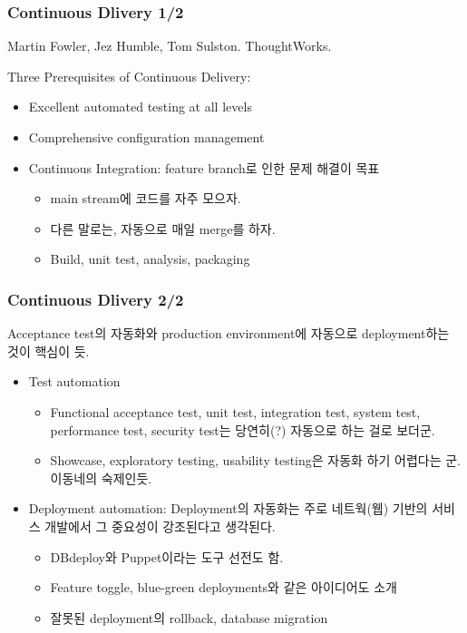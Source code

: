 \begin{frame}
\frametitle{Continuous Dlivery 1/2}

Martin Fowler, Jez Humble, Tom Sulston. ThoughtWorks.

Three Prerequisites of Continuous Delivery:
\begin{itemize}
\item Excellent automated testing at all levels
\item Comprehensive configuration management
\item Continuous Integration: feature branch로 인한 문제 해결이 목표
  \begin{itemize}
  \item main stream에 코드를 자주 모으자.
  \item 다른 말로는, 자동으로 매일 merge를 하자.
  \item Build, unit test, analysis, packaging
  \end{itemize}
\end{itemize}
\end{frame}

\begin{frame}
\frametitle{Continuous Dlivery 2/2}

Acceptance test의 자동화와 production environment에 자동으로
deployment하는 것이 핵심이 듯.
 
\begin{itemize}
\item Test automation
  \begin{itemize}
  \item Functional acceptance test, unit test, integration test,
    system test, performance test, security test는 당연히(?) 자동으로
    하는 걸로 보더군.
  \item Showcase, exploratory testing, usability testing은 자동화 하기
    어렵다는 군. 이동네의 숙제인듯.
  \end{itemize}
\item Deployment automation: Deployment의 자동화는 주로 네트웍(웹)
  기반의 서비스 개발에서 그 중요성이 강조된다고 생각된다.
  \begin{itemize}
  \item DBdeploy와 Puppet이라는 도구 선전도 함.
  \item Feature toggle, blue-green deployments와 같은 아이디어도 소개
  \item 잘못된 deployment의 rollback, database migration
  \end{itemize}
\end{itemize}

\end{frame}

